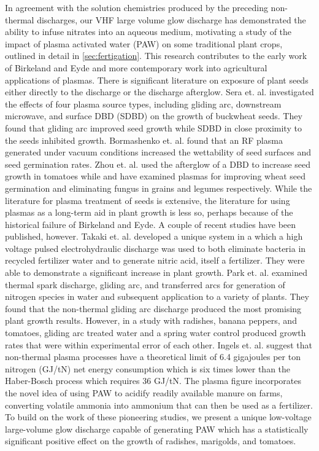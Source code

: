 In agreement with the solution chemistries produced by the preceding non-thermal discharges, our VHF large volume glow discharge has demonstrated the ability to infuse nitrates into an aqueous medium, motivating a study of the impact of plasma activated water (PAW) on some traditional plant crops, outlined in detail in \cref{sec:fertigation}. This research contributes to the early work of Birkeland and Eyde and more contemporary work into agricultural applications of plasmas. There is significant literature on exposure of plant seeds either directly to the discharge or the discharge afterglow. Sera et. al.\cite{vsera2012various} investigated the effects of four plasma source types, including gliding arc, downstream microwave, and surface DBD (SDBD) on the growth of buckwheat seeds. They found that gliding arc improved seed growth while SDBD in close proximity to the seeds inhibited growth. Bormashenko et. al.\cite{bormashenko2012cold} found that an RF plasma generated under vacuum conditions increased the wettability of seed surfaces and seed germination rates. Zhou et. al.\cite{zhou2011introduction} used the afterglow of a DBD to increase seed growth in tomatoes while \cite{huang2010effect} and \cite{filatova2012fungicidal} have examined plasmas for improving wheat seed germination and eliminating fungus in grains and legumes respectively. While the literature for plasma treatment of seeds is extensive, the literature for using plasmas as a long-term aid in plant growth is less so, perhaps because of the historical failure of Birkeland and Eyde. A couple of recent studies have been published, however. Takaki et. al.\cite{takaki2013improvements} developed a unique system in a which a high voltage pulsed electrohydraulic discharge was used to both eliminate bacteria in recycled fertilizer water and to generate nitric acid, itself a fertilizer. They were able to demonstrate a significant increase in plant growth. Park et. al.\cite{park2013reactive} examined thermal spark discharge, gliding arc, and transferred arcs for generation of nitrogen species in water and subsequent application to a variety of plants. They found that the non-thermal gliding arc discharge produced the most promising plant growth results. However, in a study with radishes, banana peppers, and tomatoes, gliding arc treated water and a spring water control produced growth rates that were within experimental error of each other. Ingels et. al. \cite{ingels2015modern} suggest that non-thermal plasma processes have a theoretical limit of 6.4 gigajoules per ton nitrogen (GJ/tN) net energy consumption which is six times lower than the Haber-Bosch process which requires 36 GJ/tN. The plasma figure incorporates the novel idea of using PAW to acidify readily available manure on farms, converting volatile ammonia into ammonium that can then be used as a fertilizer. To build on the work of these pioneering studies, we present a unique low-voltage large-volume glow discharge capable of generating PAW which has a statistically significant positive effect on the growth of radishes, marigolds, and tomatoes.

